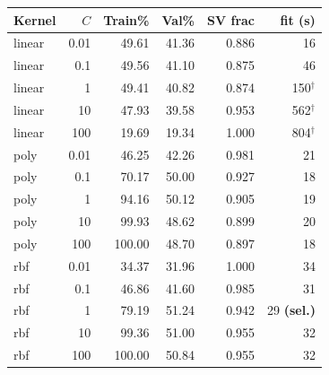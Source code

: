 \begin{tabular}{lrrrrr}
\toprule
Kernel & $C$ & Train\% & Val\% & SV frac & fit (s) \\
\midrule
linear & 0.01 & 49.61 & 41.36 & 0.886 & 16 \\
linear & 0.1 & 49.56 & 41.10 & 0.875 & 46 \\
linear & 1 & 49.41 & 40.82 & 0.874 & 150$^\dagger$ \\
linear & 10 & 47.93 & 39.58 & 0.953 & 562$^\dagger$ \\
linear & 100 & 19.69 & 19.34 & 1.000 & 804$^\dagger$ \\
poly & 0.01 & 46.25 & 42.26 & 0.981 & 21 \\
poly & 0.1 & 70.17 & 50.00 & 0.927 & 18 \\
poly & 1 & 94.16 & 50.12 & 0.905 & 19 \\
poly & 10 & 99.93 & 48.62 & 0.899 & 20 \\
poly & 100 & 100.00 & 48.70 & 0.897 & 18 \\
rbf & 0.01 & 34.37 & 31.96 & 1.000 & 34 \\
rbf & 0.1 & 46.86 & 41.60 & 0.985 & 31 \\
rbf & 1 & 79.19 & 51.24 & 0.942 & 29 \textbf{(sel.)} \\
rbf & 10 & 99.36 & 51.00 & 0.955 & 32 \\
rbf & 100 & 100.00 & 50.84 & 0.955 & 32 \\
\bottomrule
\end{tabular}
